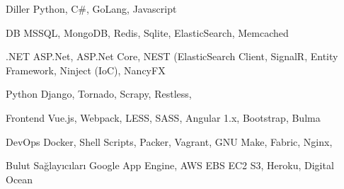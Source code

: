 

\begin{cvskills}



  \cvskill
    {Diller} %
    {Python, C\#, GoLang, Javascript} %

  
  \cvskill
    {DB}
    {MSSQL, MongoDB, Redis, Sqlite, ElasticSearch, Memcached}
    
  \cvskill
    {.NET}
    {ASP.Net, ASP.Net Core, NEST (ElasticSearch Client, SignalR, Entity Framework, Ninject (IoC), NancyFX}

  \cvskill
    {Python}
    {Django, Tornado, Scrapy, Restless, }

  \cvskill
    {Frontend}
    {Vue.js, Webpack, LESS, SASS, Angular 1.x, Bootstrap, Bulma}

  \cvskill
    {DevOps}
    {Docker, Shell Scripts, Packer, Vagrant, GNU Make, Fabric, Nginx, }

  \cvskill
    {Bulut Sağlayıcıları}
    {Google App Engine, AWS EBS EC2 S3, Heroku, Digital Ocean}
  
\end{cvskills}



